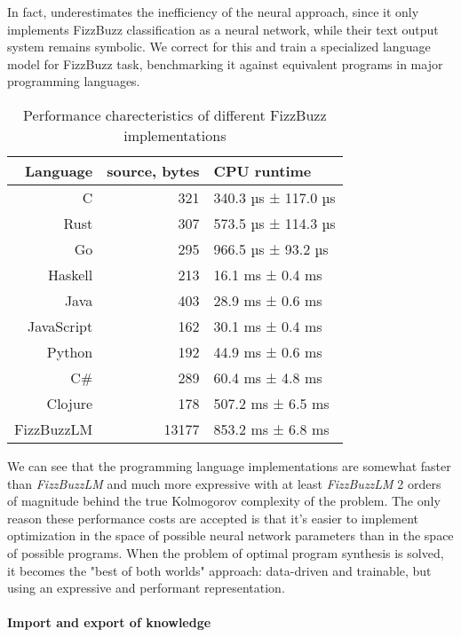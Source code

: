 In fact, \cite{JoelGrusFizz} underestimates the inefficiency of the neural approach, since it only implements FizzBuzz \cite{reesFizzBuzz1012002} classification as a neural network, while their text output system remains symbolic.
We correct for this and train a specialized language model for FizzBuzz task, benchmarking it against equivalent programs in major programming languages.

\begin{table}[H]
    \centering
    \begin{tabular}{r|r|l}
         Language & source, bytes & CPU runtime \\
         \midrule
         C & 321 & 340.3 µs ± 117.0 µs \\
         Rust & 307 & 573.5 µs ± 114.3 µs \\
         Go & 295 & 966.5 µs ±  93.2 µs \\
         Haskell & 213 & 16.1 ms ± 0.4 ms \\
         Java & 403 & 28.9 ms ± 0.6 ms \\
         JavaScript & 162 & 30.1 ms ± 0.4 ms \\
         Python & 192 & 44.9 ms ± 0.6 ms \\
         C\# & 289 & 60.4 ms ± 4.8 ms \\
         Clojure & 178 & 507.2 ms ± 6.5 ms \\
         FizzBuzzLM & 13177 & 853.2 ms ± 6.8 ms
    \end{tabular}
    \caption{Performance charecteristics of different FizzBuzz implementations}
    \label{tab:my_label}
\end{table}

We can see that the programming language implementations are somewhat faster than \emph{FizzBuzzLM} and much more expressive with at least \emph{FizzBuzzLM} 2 orders of magnitude behind the true Kolmogorov complexity \cite{kolmogorov} of the problem.
The only reason these performance costs are accepted is that it's easier to implement optimization in the space of possible neural network parameters than in the space of possible programs. 
When the problem of optimal program synthesis is solved, it becomes the "best of both worlds" approach: data-driven and trainable, but using an expressive and performant representation.
 
\paragraph{Import and export of knowledge}

